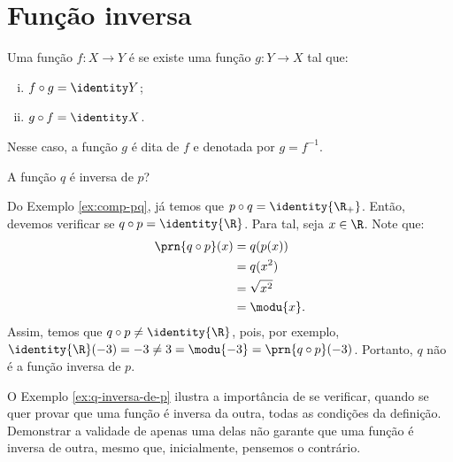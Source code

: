 \section{Função inversa}

\begin{definition}
Uma função $f: X \to Y$ é  se existe uma função $g: Y \to X$ tal que:
%
\begin{enumerate}[(i)]
  \item $f \circ g = \identity Y$;
  \item $g \circ f = \identity X$.
\end{enumerate}
%
Nesse caso, a função $g$ é dita  de $f$ e denotada por $g = f^{-1}$.
\end{definition}

\begin{example}
\label{ex:q-inversa-de-p}
    A função $q$ é inversa de $p$?
\end{example}

\begin{solution}
Do Exemplo \ref{ex:comp-pq}, já temos que $p \circ q = \identity{\R_+}$.
Então, devemos verificar se $q \circ p = \identity{\R}$.
Para tal, seja $x \in \R$. 
Note que:
%
\begin{align*}
    \prn{q \circ p}(x) &= q(p(x)) \\ &= q(x^2) \\ &= \sqrt{x^2} \\ &= \modu{x}.
\end{align*}
%
Assim, temos que $q \circ p \ne \identity{\R}$, pois, por exemplo, $\identity{\R}(-3) = -3 \ne 3 = \modu{-3} = \prn{q \circ p}(-3)$.
Portanto, $q$ não é a função inversa de $p$.
\end{solution}

O Exemplo \ref{ex:q-inversa-de-p} ilustra a importância de se verificar, quando se quer provar que uma função é inversa da outra, todas as condições da definição.
Demonstrar a validade de apenas uma delas não garante que uma função é inversa de outra, mesmo que, inicialmente, pensemos o contrário.